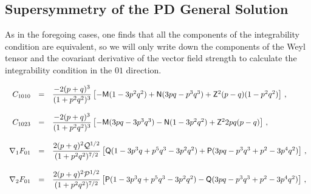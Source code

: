\documentclass[12pt,a4paper]{article}
\begin{document}

\subsection{Supersymmetry of the PD General Solution}
\label{sec-susy-PD}

As in the foregoing cases, one finds that all the components of the
integrability condition are equivalent, so we will only write down
the components of the Weyl tensor and the covariant derivative of the
vector field strength to calculate the integrability condition
in the $01$ direction.

\begin{equation}
\begin{array}{rcl}
C_{1010} & = & {\displaystyle\frac{-2(p+q)^{3}}{(1+p^{2}q^{2})^{3}}}
\left[
-\mathsf{M}(1-3p^{2}q^{2})
+\mathsf{N}(3pq -p^{3}q^{3})
+\mathsf{Z}^{2}(p-q)(1-p^{2}q^{2})
\right]\, ,\\
& & \\
C_{1023} & = & {\displaystyle\frac{-2(p+q)^{3}}{(1+p^{2}q^{2})^{3}}}
\left[
-\mathsf{M}(3pq-3p^{3}q^{3})
-\mathsf{N}(1-3p^{2}q^{2})
+\mathsf{Z}^{2}2pq(p-q)
\right]\, ,\\
& & \\
\nabla_{1}F_{01} & = & 
{\displaystyle\frac{2(p+q)^{2}{\cal Q}^{1/2}}{(1+p^{2}q^{2})^{7/2}} }
\left[
\mathsf{Q}(1-3p^{3}q +p^{5}q^{3}-3p^{2}q^{2})
+\mathsf{P}(3pq-p^{3}q^{3}+p^{2}-3p^{4}q^{2})
\right]\, ,\\
& & \\
\nabla_{2}F_{01} & = & 
{\displaystyle\frac{2(p+q)^{2}{\cal P}^{1/2}}{(1+p^{2}q^{2})^{7/2}} }
\left[
\mathsf{P}(1-3p^{3}q +p^{5}q^{3}-3p^{2}q^{2})
-\mathsf{Q}(3pq-p^{3}q^{3}+p^{2}-3p^{4}q^{2})
\right]\, ,\\
\end{array}
\end{equation}
\end{document}
